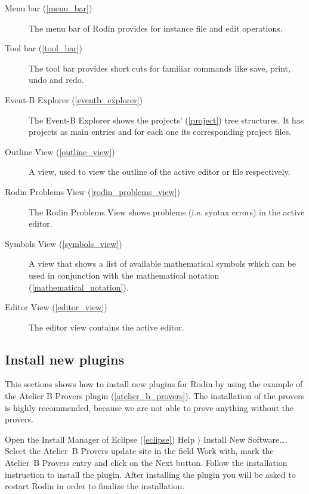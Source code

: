 \begin{description}
	\item[Menu bar (\ref{menu_bar})] The menu bar of Rodin provides for instance file and edit operations.
	\item[Tool bar (\ref{tool_bar})] The tool bar provides short cuts for familiar commands like save, print, undo and redo.
	\item[Event-B Explorer (\ref{eventb_explorer})] The Event-B Explorer shows the projects' (\ref{project}) tree structures. It has projects as main entries and for each one its corresponding project files.
	\item[Outline View (\ref{outline_view})] A view, used to view the outline of the active editor or file respectively.
	\item[Rodin Problems View (\ref{rodin_problems_view})] The Rodin Problems View shows problems (i.e. syntax errors) in the active editor.
	\item[Symbols View (\ref{symbols_view})] A view that shows a list of available mathematical symbols which can be used in conjunction with the mathematical notation (\ref{mathematical_notation}).
	\item[Editor View (\ref{editor_view})] The editor view contains the active editor.
\end{description}

\subsection{Install new plugins}

This sections shows how to install new plugins for Rodin by using the example of the Atelier B Provers plugin (\ref{atelier_b_provers}). The installation of the provers is highly recommended, because we are not able to prove anything without the provers.

Open the Install Manager of Eclipse (\ref{eclipse}) \textsf{Help $\rangle$ Install New Software\ldots}. Select the Atelier~B Provers update site in the field \textsf{Work with}, mark the Atelier~B Provers entry and click on the \textsf{Next} button. Follow the installation instruction to install the plugin. After installing the plugin you will be asked to restart Rodin in order to finalize the installation.

